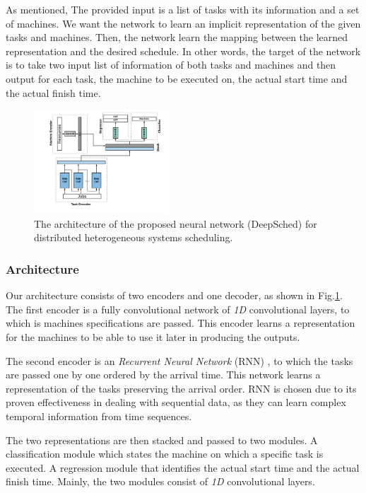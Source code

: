 As mentioned, The provided input is a list of tasks with its information and a set of machines. We want the network to learn an implicit representation of the given tasks and machines. Then, the network learn the mapping between the learned representation and the desired schedule. In other words, the target of the network is to take two input list of information of both tasks and machines and then output for each task, the machine to be executed on, the actual start time and the actual finish time. \\

\begin{figure}[hp]
    \centering
    \includegraphics[width=0.45\textwidth]{diagrams/sched_nn}
    \caption{The architecture of the proposed neural network (DeepSched) for distributed heterogeneous systems scheduling.}
    \label{fig:nn}
\end{figure}
    
\subsubsection{Architecture}
Our architecture consists of two encoders and one decoder, as shown in Fig.\ref{fig:nn}. \\
The first encoder is a fully convolutional network of \emph{1D} convolutional layers, to which is machines specifications are passed. This encoder learns a representation for the machines to be able to use it later in producing the outputs.

The second encoder is an \emph{Recurrent Neural Network} (RNN) \cite{chung2014empirical}, to which the tasks are passed one by one ordered by the arrival time. This network learns a representation of the tasks preserving the arrival order. RNN is chosen due to its proven effectiveness in dealing with sequential data, as they can learn complex temporal information from time sequences.

The two representations are then stacked and passed to two modules. A classification module which states the machine on which a specific task is executed. A regression module that identifies the actual start time and the actual finish time. Mainly, the two modules consist of \emph{1D} convolutional layers.
    
